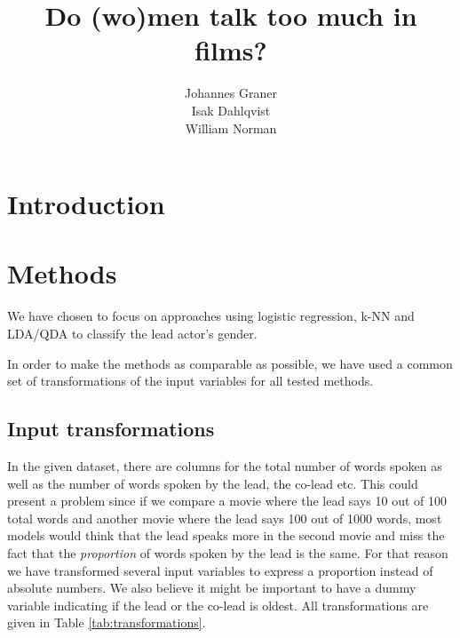 \documentclass{article}
\title{Do (wo)men talk too much in films?}
\author{%
  Johannes Graner \\
  \And
  Isak Dahlqvist \\
  \AND
  William Norman \\
}
\begin{document}
\maketitle

\begin{abstract}
  
\end{abstract}

\section{Introduction}

\section{Methods}
We have chosen to focus on approaches using logistic regression, k-NN and LDA/QDA to classify the lead actor's gender.

In order to make the methods as comparable as possible, we have used a common set of transformations of the input variables for all tested methods.

\subsection{Input transformations}
In the given dataset, there are columns for the total number of words spoken as well as the number of words spoken by the lead, the co-lead etc. This could present a problem since if we compare a movie where the lead says 10 out of 100 total words and another movie where the lead says 100 out of 1000 words, most models would think that the lead speaks more in the second movie and miss the fact that the \textit{proportion} of words spoken by the lead is the same. For that reason we have transformed several input variables to express a proportion instead of absolute numbers. We also believe it might be important to have a dummy variable indicating if the lead or the co-lead is oldest. All transformations are given in Table \ref{tab:transformations}.
\end{document}
